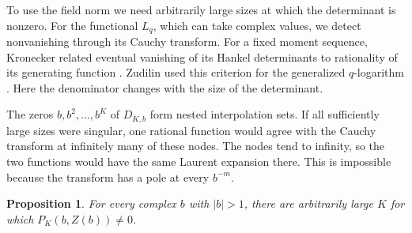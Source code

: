\documentclass[11pt,letterpaper]{article}
\newtheorem{proposition}[theorem]{Proposition}
\numberwithin{equation}{section}
\begin{document}
To use the field norm we need arbitrarily large sizes at which the
determinant is nonzero. For the functional \(L_q\), which can take
complex values, we detect nonvanishing through its Cauchy transform.
For a fixed moment sequence, Kronecker related eventual vanishing of
its Hankel determinants to rationality of its generating function
\cite[Arts.~VII and~IX]{Kronecker}. Zudilin used this criterion for
the generalized \(q\)-logarithm \cite[\S4]{Zudilin}. Here the
denominator changes with the size of the determinant.

The zeros \(b,b^2,\ldots,b^K\) of \(D_{K,b}\) form nested interpolation
sets. If all sufficiently large sizes were singular, one rational
function would agree with the Cauchy transform at infinitely many of
these nodes. The nodes tend to infinity, so the two functions would
have the same Laurent expansion there. This is impossible because the
transform has a pole at every \(b^{-m}\).

\begin{proposition}\label{prop:nonzero}
For every complex \(b\) with \(|b|>1\), there are arbitrarily large
\(K\) for which \(P_K(b,Z(b))\ne0\).
\end{proposition}
\end{document}
